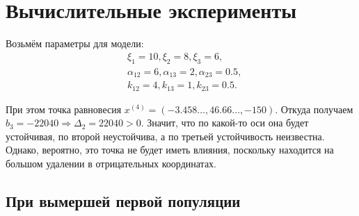 \section{Вычислительные эксперименты}
    Возьмём параметры для модели:
    \[
        \begin{split}
            & \xi_1 = 10, \xi_2 = 8, \xi_3 = 6, \\
            & \alpha_{12} = 6, \alpha_{13} = 2, \alpha_{23} = 0.5, \\
            & k_{12} = 4, k_{13} = 1, k_{23} = 0.5.
        \end{split}
    \]

    При этом точка равновесия \( x^{(4)} = ( -3.458\dots, 46.66\dots, -150 ) \). Откуда получаем \( b_3 = -22040 \Rightarrow \Delta_2 = 22040 > 0 \). Значит, что по какой-то оси она будет устойчивая, по второй неустойчива, а по третьей устойчивость неизвестна. Однако, вероятно, это точка не будет иметь влияния, поскольку находится на большом удалении в отрицательных координатах.

    \subsection{При вымершей первой популяции}

